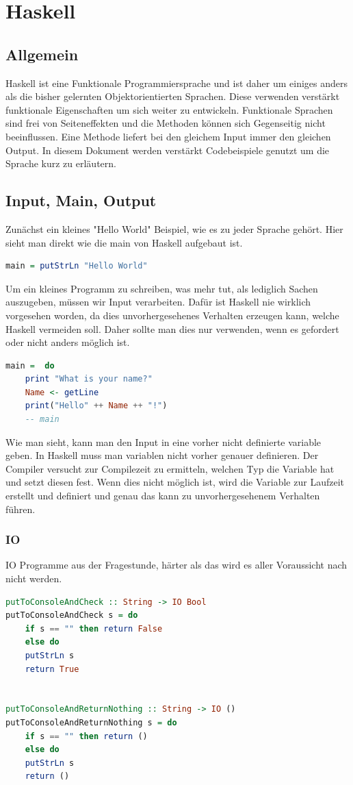 \chapter{Haskell}
\label{sec:Haskell}
\section{Allgemein}
Haskell ist eine Funktionale Programmiersprache und ist daher um einiges anders als die bisher gelernten Objektorientierten Sprachen. Diese verwenden verstärkt funktionale Eigenschaften um sich weiter zu entwickeln. Funktionale Sprachen sind frei von Seiteneffekten und die Methoden können sich Gegenseitig nicht beeinflussen. Eine Methode liefert bei den gleichem Input immer den gleichen Output.
In diesem Dokument werden verstärkt Codebeispiele genutzt um die Sprache kurz zu erläutern. 
\section{Input, Main, Output}
Zunächst ein kleines "Hello World" Beispiel, wie es zu jeder Sprache gehört. Hier sieht man direkt wie die main von Haskell aufgebaut ist.
\newline
\begin{lstlisting}[language=Haskell]  
main = putStrLn "Hello World"
\end{lstlisting}
\qquad\newline
Um ein kleines Programm zu schreiben, was mehr tut, als lediglich Sachen auszugeben, müssen wir Input verarbeiten. Dafür ist Haskell nie wirklich vorgesehen worden, da dies unvorhergesehenes Verhalten erzeugen kann, welche Haskell vermeiden soll. Daher sollte man dies nur verwenden, wenn es gefordert oder nicht anders möglich ist. 
\newline
\begin{lstlisting}[language=Haskell]  
main = 	do
	print "What is your name?"
	Name <- getLine
	print("Hello" ++ Name ++ "!")
	-- main 
\end{lstlisting}
\qquad\newline
Wie man sieht, kann man den Input in eine vorher nicht definierte variable geben. In Haskell muss man variablen nicht vorher genauer definieren. Der Compiler versucht zur Compilezeit zu ermitteln, welchen Typ die Variable hat und setzt diesen fest. Wenn dies nicht möglich ist, wird die Variable zur Laufzeit erstellt und definiert und genau das kann zu unvorhergesehenem Verhalten führen. 
\subsection{IO}
IO Programme aus der Fragestunde, härter als das wird es aller Voraussicht nach nicht werden. 
\begin{lstlisting}[language=Haskell]  
putToConsoleAndCheck :: String -> IO Bool
putToConsoleAndCheck s = do
	if s == "" then return False 
	else do
	putStrLn s
	return True


putToConsoleAndReturnNothing :: String -> IO ()
putToConsoleAndReturnNothing s = do
	if s == "" then return () 
	else do
	putStrLn s
	return ()
\end{lstlisting}
